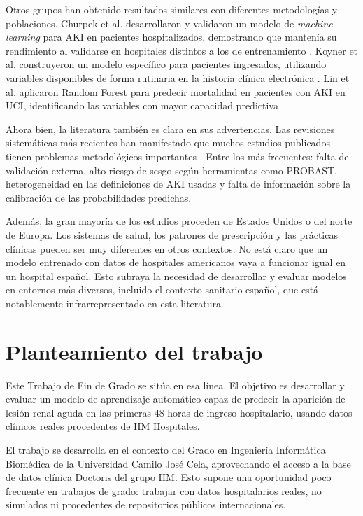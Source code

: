 \documentclass[12pt, a4paper, oneside]{report}
\begin{document}
Otros grupos han obtenido resultados similares con diferentes metodologías y poblaciones. Churpek et al. desarrollaron y validaron un modelo de \textit{machine learning} para AKI en pacientes hospitalizados, demostrando que mantenía su rendimiento al validarse en hospitales distintos a los de entrenamiento \parencite{churpek2020validation}. Koyner et al. construyeron un modelo específico para pacientes ingresados, utilizando variables disponibles de forma rutinaria en la historia clínica electrónica \parencite{koyner2018ml}. Lin et al. aplicaron Random Forest para predecir mortalidad en pacientes con AKI en UCI, identificando las variables con mayor capacidad predictiva \parencite{lin2019randomforest}.

Ahora bien, la literatura también es clara en sus advertencias. Las revisiones sistemáticas más recientes han manifestado que muchos estudios publicados tienen problemas metodológicos importantes \parencite{rank2022mlaki, shi2025aiaki}. Entre los más frecuentes: falta de validación externa, alto riesgo de sesgo según herramientas como PROBAST, heterogeneidad en las definiciones de AKI usadas y falta de información sobre la calibración de las probabilidades predichas.

Además, la gran mayoría de los estudios proceden de Estados Unidos o del norte de Europa. Los sistemas de salud, los patrones de prescripción y las prácticas clínicas pueden ser muy diferentes en otros contextos. No está claro que un modelo entrenado con datos de hospitales americanos vaya a funcionar igual en un hospital español. Esto subraya la necesidad de desarrollar y evaluar modelos en entornos más diversos, incluido el contexto sanitario español, que está notablemente infrarrepresentado en esta literatura.

\section{Planteamiento del trabajo}

Este Trabajo de Fin de Grado se sitúa en esa línea. El objetivo es desarrollar y evaluar un modelo de aprendizaje automático capaz de predecir la aparición de lesión renal aguda en las primeras 48 horas de ingreso hospitalario, usando datos clínicos reales procedentes de HM Hospitales.

El trabajo se desarrolla en el contexto del Grado en Ingeniería Informática Biomédica de la Universidad Camilo José Cela, aprovechando el acceso a la base de datos clínica Doctoris del grupo HM. Esto supone una oportunidad poco frecuente en trabajos de grado: trabajar con datos hospitalarios reales, no simulados ni procedentes de repositorios públicos internacionales.
\end{document}
